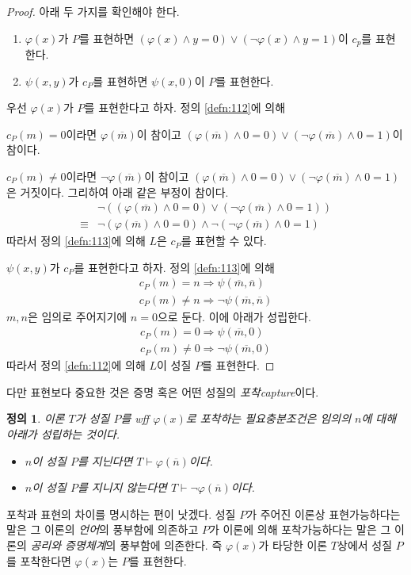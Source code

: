 \documentclass[a4paper,chapter,atbegshi]{oblivoir}
\newtheorem{defn}{정의}[chapter]
\begin{document}
\begin{proof}
  아래 두 가지를 확인해야 한다. 
  \begin{enumerate}
    \item $\varphi(x)$가 $P$를 표현하면 $(\varphi(x)\wedge y=0)\vee (\neg
      \varphi(x)\wedge y=1)$이 $c_p$를 표현한다.
    \item $\psi(x,y)$가 $c_P$를 표현하면 $\psi(x,0)$이 $P$를 표현한다.
  \end{enumerate}
  우선 $\varphi(x)$가 $P$를 표현한다고 하자. 정의 \ref{defn:112}에 의해

  $c_P(m)=0$이라면 $\varphi(\overline{m})$이 참이고 
  $(\varphi(\overline{m})\wedge0=0)\vee
  (\neg\varphi(\overline{m})\wedge0=1)$이 참이다.
  
  $c_P(m)\neq0$이라면 $\neg\varphi(\overline{m})$이 참이고
  $(\varphi(\overline{m})\wedge0=0)\vee
  (\neg\varphi(\overline{m})\wedge0=1)$은 거짓이다. 그리하여 아래 같은 부정이
  참이다.
  \begin{align*}
  &\neg((\varphi(\overline{m})\wedge0=0)\vee(\neg\varphi(\overline{m})\wedge0=1))\\
  \equiv&\neg(\varphi(\overline{m})\wedge0=0)\wedge\neg(\neg\varphi(\overline{m})\wedge0=1)
  \end{align*}
  따라서 정의 \ref{defn:113}에 의해 $L$은 $c_P$를 표현할 수 있다.
  
  $\psi(x,y)$가 $c_P$를 표현한다고 하자. 정의 \ref{defn:113}에 의해
  \begin{align*}
    c_P(m)=n\Rightarrow\psi(\overline{m},\overline{n}) \\
    c_P(m)\neq n\Rightarrow \neg\psi(\overline{m},\overline{n})
\end{align*}
$m,n$은 임의로 주어지기에 $n=0$으로 둔다. 이에 아래가 성립한다.
\begin{align*}
  c_P(m)=0\Rightarrow\psi(\overline{m},0)\\
  c_P(m)\neq0\Rightarrow\neg\psi(\overline{m},0)
\end{align*}
따라서 정의 \ref{defn:112}에 의해 $L$이 성질 $P$를 표현한다.
\end{proof}
다만 표현보다 중요한 것은 증명 혹은 어떤 성질의 \emph{포착\tiny capture}이다.
\begin{defn}
  이론 $T$가 성질 $P$를 wff $\varphi(x)$로 포착하는 필요충분조건은
  임의의 $n$에 대해 아래가 성립하는 것이다.
  \begin{itemize}
    \item $n$이 성질 $P$를 지닌다면 $T\vdash\varphi(\overline{n})$이다.
    \item $n$이 성질 $P$를 지니지 않는다면 $T\vdash\neg\varphi(\overline{n})$이다.
  \end{itemize}
\end{defn}
포착과 표현의 차이를 명시하는 편이 낫겠다. 성질 $P$가 주어진 이론상 표현가능하다는
말은 그 이론의 \emph{언어}의 풍부함에 의존하고 $P$가 이론에 의해 포착가능하다는
말은 그 이론의 \emph{공리와 증명체계}의 풍부함에 의존한다. 즉 $\varphi(x)$가 
타당한 이론 $T$상에서 성질 $P$를 포착한다면 $\varphi(x)$는 $P$를 표현한다.
\end{document}
